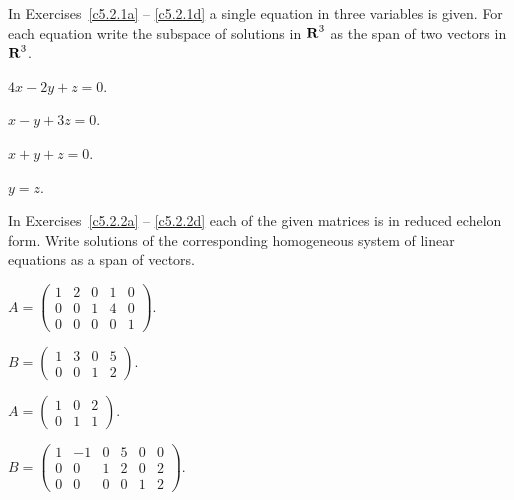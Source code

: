 \documentclass{ximera}
\begin{document}
\EXER

\TEXER

\noindent In Exercises~\ref{c5.2.1a} -- \ref{c5.2.1d} a single equation in
three variables is given.  For each equation write the subspace of solutions
in $\mbox{$\bf{R}$}^3$ as the span of two vectors in $\mbox{$\bf{R}$}^3$.
\begin{exercise} \label{c5.2.1a}
$4x - 2y + z = 0$.
\end{exercise}
\begin{exercise} \label{c5.2.1b}
$x - y + 3z = 0$.
\end{exercise}
\begin{exercise} \label{c5.2.1c}
$x + y + z = 0$.
\end{exercise}
\begin{exercise} \label{c5.2.1d}
$y=z$.
\end{exercise}

\noindent In Exercises~\ref{c5.2.2a} -- \ref{c5.2.2d} each of the
given matrices is in reduced echelon form.  Write solutions of the
corresponding homogeneous system of linear equations as a span of vectors.
\begin{exercise} \label{c5.2.2a}
$A = \left(\begin{array}{rrrrr} 1 & 2 & 0 & 1 & 0 \\
	0 & 0 & 1 & 4 & 0 \\ 0 & 0 & 0 & 0 & 1 \end{array}\right)$.
\end{exercise}
\begin{exercise} \label{c5.2.2b}
$B = \left(\begin{array}{rrrr} 1 & 3 & 0 & 5 \\
	0 & 0 & 1 & 2 \end{array}\right)$.
\end{exercise}

\begin{exercise} \label{c5.2.2c}
$A = \left(\begin{array}{rrr} 1 & 0 & 2 \\
        0 & 1 & 1\end{array}\right)$.
\end{exercise}
\begin{exercise} \label{c5.2.2d}
$B = \left(\begin{array}{rrrrrr} 1 & -1 & 0 & 5 & 0 & 0\\
        0 & 0 & 1 & 2 & 0 & 2\\
        0 & 0 & 0 & 0 & 1 & 2\end{array}\right)$.
\end{exercise}
\end{document}
